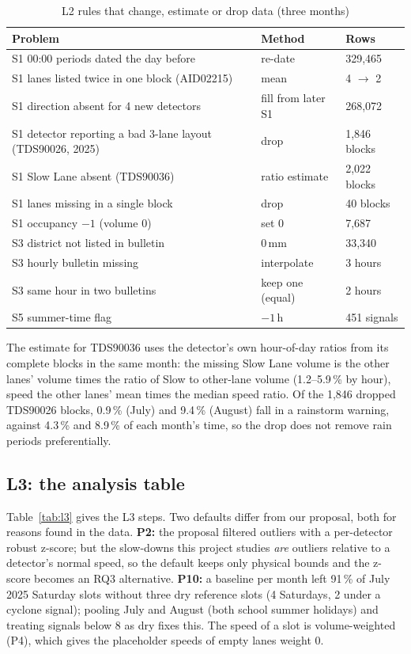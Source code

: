 \documentclass[conference]{IEEEtran}
\begin{document}
\begin{table}[t]
\centering
\caption{L2 rules that change, estimate or drop data (three months)}
\label{tab:l2}
\footnotesize
\begin{tabular}{@{}p{3.9cm}p{1.1cm}p{2.3cm}@{}}
\toprule
Problem & Method & Rows \\
\midrule
S1 00:00 periods dated the day before & re-date & 329,465 \\
S1 lanes listed twice in one block (AID02215) & mean & 4 $\to$ 2 \\
S1 direction absent for 4 new detectors & fill from later S1 & 268,072 \\
S1 detector reporting a bad 3-lane layout (TDS90026, 2025) & drop & 1,846 blocks \\
S1 Slow Lane absent (TDS90036) & ratio estimate & 2,022 blocks \\
S1 lanes missing in a single block & drop & 40 blocks \\
S1 occupancy $-1$ (volume 0) & set 0 & 7,687 \\
S3 district not listed in bulletin & 0\,mm & 33,340 \\
S3 hourly bulletin missing & interpolate & 3 hours \\
S3 same hour in two bulletins & keep one (equal) & 2 hours \\
S5 summer-time flag & $-1$\,h & 451 signals \\
\bottomrule
\end{tabular}
\end{table}

The estimate for TDS90036 uses the detector's own hour-of-day ratios from its complete blocks
in the same month: the missing Slow Lane volume is the other lanes' volume times the ratio of
Slow to other-lane volume (1.2--5.9\,\% by hour), speed the other lanes' mean times the median
speed ratio. Of the 1,846 dropped TDS90026 blocks, 0.9\,\% (July) and 9.4\,\% (August) fall
in a rainstorm warning, against 4.3\,\% and 8.9\,\% of each month's time, so the drop does not
remove rain periods preferentially.

\subsection{L3: the analysis table}
Table~\ref{tab:l3} gives the L3 steps. Two defaults differ from our proposal, both for reasons
found in the data. \textbf{P2:} the proposal filtered outliers with a per-detector robust
z-score; but the slow-downs this project studies \emph{are} outliers relative to a detector's
normal speed, so the default keeps only physical bounds and the z-score becomes an RQ3
alternative. \textbf{P10:} a baseline per month left 91\,\% of July 2025 Saturday slots without
three dry reference slots (4 Saturdays, 2 under a cyclone signal); pooling July and August
(both school summer holidays) and treating signals below 8 as dry fixes this. The speed of a
slot is volume-weighted (P4), which gives the placeholder speeds of empty lanes weight 0.
\end{document}
